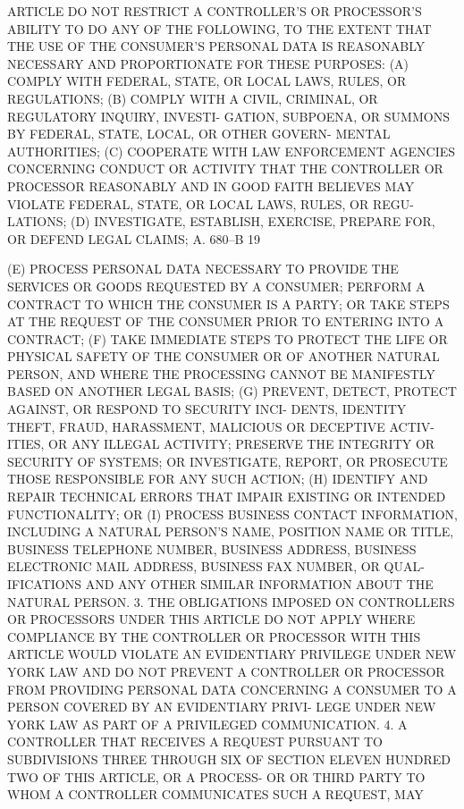  ARTICLE  DO NOT RESTRICT A CONTROLLER'S OR PROCESSOR'S ABILITY TO DO ANY
 OF THE FOLLOWING, TO THE EXTENT THAT THE USE OF THE CONSUMER'S  PERSONAL
 DATA IS REASONABLY NECESSARY AND PROPORTIONATE FOR THESE PURPOSES:
   (A) COMPLY WITH FEDERAL, STATE, OR LOCAL LAWS, RULES, OR REGULATIONS;
   (B)  COMPLY  WITH  A  CIVIL, CRIMINAL, OR REGULATORY INQUIRY, INVESTI-
 GATION, SUBPOENA, OR SUMMONS BY FEDERAL, STATE, LOCAL, OR OTHER  GOVERN-
 MENTAL AUTHORITIES;
   (C)  COOPERATE  WITH  LAW  ENFORCEMENT  AGENCIES CONCERNING CONDUCT OR
 ACTIVITY THAT THE CONTROLLER OR PROCESSOR REASONABLY AND IN  GOOD  FAITH
 BELIEVES  MAY  VIOLATE  FEDERAL,  STATE,  OR LOCAL LAWS, RULES, OR REGU-
 LATIONS;
   (D) INVESTIGATE, ESTABLISH, EXERCISE, PREPARE  FOR,  OR  DEFEND  LEGAL
 CLAIMS;
 A. 680--B                          19
 
   (E)  PROCESS  PERSONAL DATA NECESSARY TO PROVIDE THE SERVICES OR GOODS
 REQUESTED BY A CONSUMER; PERFORM A CONTRACT TO WHICH THE CONSUMER  IS  A
 PARTY;  OR  TAKE  STEPS AT THE REQUEST OF THE CONSUMER PRIOR TO ENTERING
 INTO A CONTRACT;
   (F) TAKE IMMEDIATE STEPS TO PROTECT THE LIFE OR PHYSICAL SAFETY OF THE
 CONSUMER  OR  OF ANOTHER NATURAL PERSON, AND WHERE THE PROCESSING CANNOT
 BE MANIFESTLY BASED ON ANOTHER LEGAL BASIS;
   (G) PREVENT, DETECT, PROTECT AGAINST, OR  RESPOND  TO  SECURITY  INCI-
 DENTS,  IDENTITY THEFT, FRAUD, HARASSMENT, MALICIOUS OR DECEPTIVE ACTIV-
 ITIES, OR ANY ILLEGAL ACTIVITY; PRESERVE THE INTEGRITY  OR  SECURITY  OF
 SYSTEMS;  OR INVESTIGATE, REPORT, OR PROSECUTE THOSE RESPONSIBLE FOR ANY
 SUCH ACTION;
   (H) IDENTIFY AND REPAIR  TECHNICAL  ERRORS  THAT  IMPAIR  EXISTING  OR
 INTENDED FUNCTIONALITY; OR
   (I) PROCESS BUSINESS CONTACT INFORMATION, INCLUDING A NATURAL PERSON'S
 NAME,  POSITION  NAME  OR  TITLE,  BUSINESS  TELEPHONE  NUMBER, BUSINESS
 ADDRESS, BUSINESS ELECTRONIC MAIL ADDRESS, BUSINESS FAX NUMBER, OR QUAL-
 IFICATIONS AND ANY OTHER SIMILAR INFORMATION ABOUT THE NATURAL PERSON.
   3. THE OBLIGATIONS IMPOSED ON CONTROLLERS  OR  PROCESSORS  UNDER  THIS
 ARTICLE  DO  NOT  APPLY  WHERE COMPLIANCE BY THE CONTROLLER OR PROCESSOR
 WITH THIS ARTICLE WOULD VIOLATE AN EVIDENTIARY PRIVILEGE UNDER NEW  YORK
 LAW AND DO NOT PREVENT A CONTROLLER OR PROCESSOR FROM PROVIDING PERSONAL
 DATA  CONCERNING A CONSUMER TO A PERSON COVERED BY AN EVIDENTIARY PRIVI-
 LEGE UNDER NEW YORK LAW AS PART OF A PRIVILEGED COMMUNICATION.
   4. A CONTROLLER THAT RECEIVES A REQUEST PURSUANT TO SUBDIVISIONS THREE
 THROUGH SIX OF SECTION ELEVEN HUNDRED TWO OF THIS ARTICLE, OR A PROCESS-
 OR OR THIRD PARTY TO WHOM A CONTROLLER COMMUNICATES SUCH A REQUEST,  MAY
